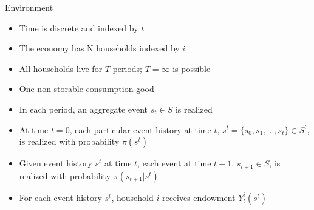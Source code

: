 \documentclass[9pt]{beamer}
\newcommand{\bit}{\begin{itemize}}
\newcommand{\eit}{\end{itemize}}
\begin{document}
\begin{frame}{Environment}

\bit
\setlength\itemsep{1em}

\item Time is discrete and indexed by $t$

\item The economy has N households indexed by $i$

\item All households live for $T$ periods; $T = \infty$ is possible

\item One non-storable consumption good

\item In each period, an aggregate event $s_t \in S$ is realized

\item At time $t=0$, each particular event history at time $t$, $s^t = \{s_0, s_1, ..., s_t\} \in S^t$, is realized with probability $\pi(s^t)$

\item Given event history $s^t$ at time $t$, each event at time $t+1$, $s_{t+1} \in S$, is realized with probability $\pi(s_{t+1}|s^t)$

\item For each event history $s^t$, household $i$ receives endowment $Y^i_t(s^t)$
\eit

\end{frame}
\end{document}
